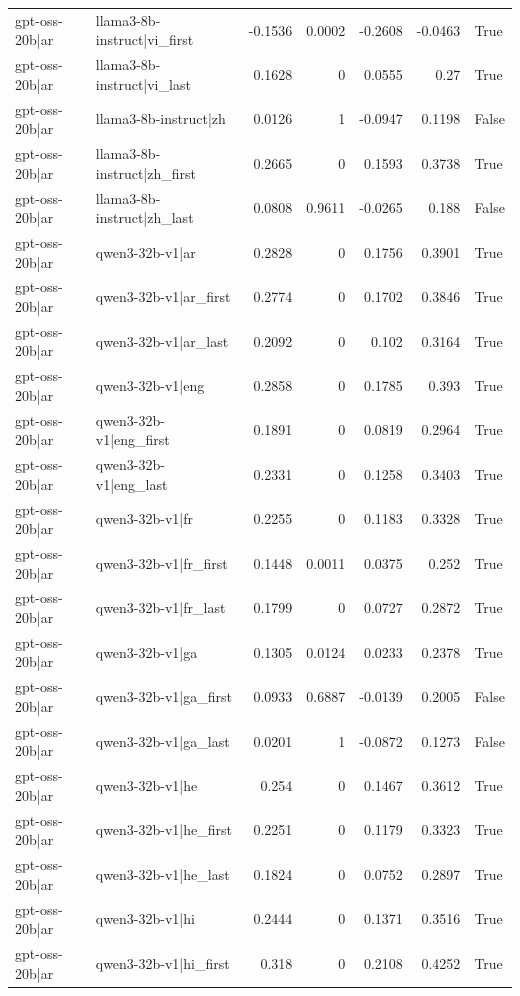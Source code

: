 \begin{table}
\begin{tabular}{l l r r r r l}
gpt-oss-20b|ar & llama3-8b-instruct|vi_first & -0.1536 & 0.0002 & -0.2608 & -0.0463 & True \\
gpt-oss-20b|ar & llama3-8b-instruct|vi_last & 0.1628 & 0 & 0.0555 & 0.27 & True \\
gpt-oss-20b|ar & llama3-8b-instruct|zh & 0.0126 & 1 & -0.0947 & 0.1198 & False \\
gpt-oss-20b|ar & llama3-8b-instruct|zh_first & 0.2665 & 0 & 0.1593 & 0.3738 & True \\
gpt-oss-20b|ar & llama3-8b-instruct|zh_last & 0.0808 & 0.9611 & -0.0265 & 0.188 & False \\
gpt-oss-20b|ar & qwen3-32b-v1|ar & 0.2828 & 0 & 0.1756 & 0.3901 & True \\
gpt-oss-20b|ar & qwen3-32b-v1|ar_first & 0.2774 & 0 & 0.1702 & 0.3846 & True \\
gpt-oss-20b|ar & qwen3-32b-v1|ar_last & 0.2092 & 0 & 0.102 & 0.3164 & True \\
gpt-oss-20b|ar & qwen3-32b-v1|eng & 0.2858 & 0 & 0.1785 & 0.393 & True \\
gpt-oss-20b|ar & qwen3-32b-v1|eng_first & 0.1891 & 0 & 0.0819 & 0.2964 & True \\
gpt-oss-20b|ar & qwen3-32b-v1|eng_last & 0.2331 & 0 & 0.1258 & 0.3403 & True \\
gpt-oss-20b|ar & qwen3-32b-v1|fr & 0.2255 & 0 & 0.1183 & 0.3328 & True \\
gpt-oss-20b|ar & qwen3-32b-v1|fr_first & 0.1448 & 0.0011 & 0.0375 & 0.252 & True \\
gpt-oss-20b|ar & qwen3-32b-v1|fr_last & 0.1799 & 0 & 0.0727 & 0.2872 & True \\
gpt-oss-20b|ar & qwen3-32b-v1|ga & 0.1305 & 0.0124 & 0.0233 & 0.2378 & True \\
gpt-oss-20b|ar & qwen3-32b-v1|ga_first & 0.0933 & 0.6887 & -0.0139 & 0.2005 & False \\
gpt-oss-20b|ar & qwen3-32b-v1|ga_last & 0.0201 & 1 & -0.0872 & 0.1273 & False \\
gpt-oss-20b|ar & qwen3-32b-v1|he & 0.254 & 0 & 0.1467 & 0.3612 & True \\
gpt-oss-20b|ar & qwen3-32b-v1|he_first & 0.2251 & 0 & 0.1179 & 0.3323 & True \\
gpt-oss-20b|ar & qwen3-32b-v1|he_last & 0.1824 & 0 & 0.0752 & 0.2897 & True \\
gpt-oss-20b|ar & qwen3-32b-v1|hi & 0.2444 & 0 & 0.1371 & 0.3516 & True \\
gpt-oss-20b|ar & qwen3-32b-v1|hi_first & 0.318 & 0 & 0.2108 & 0.4252 & True \\

\end{tabular}
\end{table}

